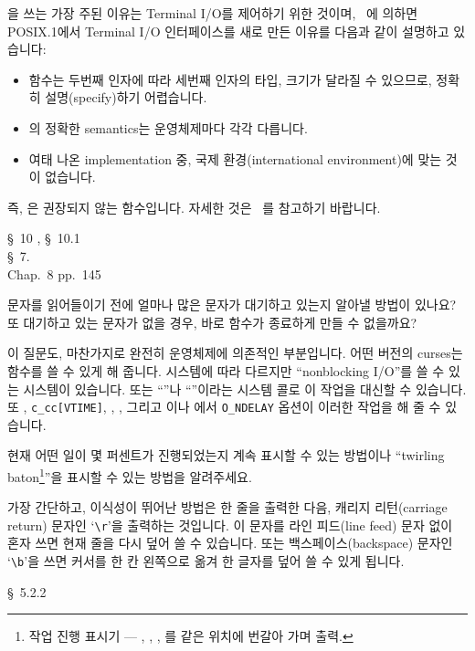 \begin{faq}
\T
	을 쓰는 가장 주된 이유는 Terminal I/O를 제어하기
	위한 것이며, \cite{ppg}~에 의하면 POSIX.1에서 Terminal I/O
	인터페이스를 새로 만든 이유를 다음과 같이 설명하고 있습니다:

\begin{itemize}
	\item {} 함수는 두번째 인자에 따라 세번째 인자의
	타입, 크기가 달라질 수 있으므로, 정확히 설명(specify)하기
	어렵습니다.

	\item {}의 정확한 semantics는 운영체제마다 각각 다릅니다.

	\item 여태 나온 implementation 중, 국제 환경(international
	environment)에 맞는 것이 없습니다.
\end{itemize}

	즉, 은 권장되지 않는 함수입니다. 자세한 것은 \cite{ppg}~를
	참고하기 바랍니다.

\R
	\cite{pcs} \S\ 10 , \S\ 10.1  \\
	\cite{posix} \S\ 7. \\
	\cite{ppg} Chap.\ 8 pp.\ 145
\end{faq}

\begin{faq}
	문자를 읽어들이기 전에 얼마나 많은 문자가 대기하고 있는지
	알아낼 방법이 있나요? 또 대기하고 있는 문자가 없을 경우,
	바로 함수가 종료하게 만들 수 없을까요?

\A
	이 질문도, 마찬가지로 완전히 운영체제에 의존적인 부분입니다.
	어떤 버전의 curses는  함수를 쓸 수 있게 해 줍니다.
	시스템에 따라 다르지만 ``nonblocking I/O''를 쓸 수 있는
	시스템이 있습니다.  또는 ``''나 ``''이라는
	시스템 콜로 이 작업을 대신할 수 있습니다.
	또  , \verb+c_cc[VTIME]+, ,
	, 그리고 이나 에서 \verb+O_NDELAY+
	옵션이 이러한 작업을 해 줄 수 있습니다.
\end{faq}


\begin{faq}
	현재 어떤 일이 몇 퍼센트가 진행되었는지 계속 표시할 수 있는 방법이나
	``twirling baton\footnote{작업 진행 표시기 ---
	\TT{-}, \TT{/}, \TT{|}, \TT{$\backslash$}를
	같은 위치에 번갈아 가며 출력.}''을
	표시할 수 있는 방법을 알려주세요.
	
\A
	가장 간단하고, 이식성이 뛰어난 방법은 한 줄을 출력한 다음,
	캐리지 리턴(carriage return) 문자인 `\verb+\r+'을 출력하는
	것입니다.  이 문자를 라인 피드(line feed) 문자 없이 혼자 쓰면
	현재 줄을 다시 덮어 쓸 수 있습니다.
	또는 백스페이스(backspace) 문자인 `\verb+\b+'을 쓰면 커서를
	한 칸 왼쪽으로 옮겨 한 글자를 덮어 쓸 수 있게 됩니다.

\R
	\cite{c89} \S\ 5.2.2
\end{faq}

